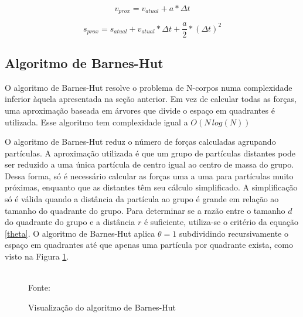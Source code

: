 \documentclass[rel_mlp]{iiufrgs}
\newcommand{\fonte}[1]{\\Fonte: {#1}}
\begin{document}
\begin{equation}
\label{velocityEq}
v_{prox} = v_{atual} + a*\Delta t
\end{equation}

\begin{equation}
\label{positionEq}
s_{prox} = s_{atual} + v_{atual}*\Delta t + \frac{a}{2}*(\Delta t)^2
\end{equation}

\subsection{Algoritmo de Barnes-Hut}

O algoritmo de Barnes-Hut resolve o problema de N-corpos numa complexidade inferior àquela apresentada na seção anterior. Em vez de calcular todas as forças, uma aproximação baseada em árvores que divide o espaço em quadrantes é utilizada. Esse algoritmo tem complexidade igual a $O(N\,log(N))$

O algoritmo de Barnes-Hut reduz o número de forças calculadas agrupando partículas. A aproximação utilizada é que um grupo de partículas distantes pode ser reduzido a uma única partícula de centro igual ao centro de massa do grupo. Dessa forma, só é necessário calcular as forças uma a uma para partículas muito próximas, enquanto que as distantes têm seu cálculo simplificado. A simplificação só é válida quando a distância da partícula ao grupo é grande em relação ao tamanho do quadrante do grupo. Para determinar se a razão entre o tamanho $d$ do quadrante do grupo e a distância $r$ é suficiente, utiliza-se o critério da equação \eqref{theta}. O algoritmo de Barnes-Hut aplica $\theta=1$ subdividindo recursivamente o espaço em quadrantes até que apenas uma partícula por quadrante exista, como visto na Figura \ref{fig:barneshut.eps}.



\begin{figure}[htb]
    \centering
    \caption{Visualização do algoritmo de Barnes-Hut}
    \fonte{\cite{barnesHutImg}}
    \label{fig:barneshut.eps}
\end{figure}
\end{document}
